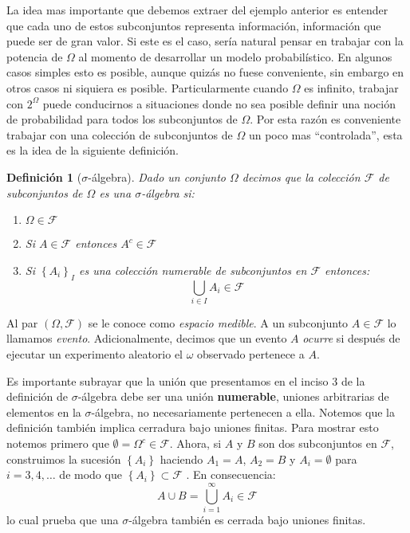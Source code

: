 \documentclass{extreport}
\theoremstyle{definicion}
\newtheorem{definition}{Definición}[chapter]
\theoremstyle{propiedad}
\theoremstyle{teorema}
\begin{document}
La idea mas importante que debemos extraer del ejemplo anterior es entender que cada uno de estos subconjuntos representa información, información que puede ser de gran valor. Si este es el caso, sería natural pensar en trabajar con la potencia de $\Omega$ al momento de desarrollar un modelo probabilístico. En algunos casos simples esto es posible, aunque quizás no fuese conveniente, sin embargo en otros casos ni siquiera es posible. Particularmente cuando $\Omega$ es infinito, trabajar con $2^\Omega$ puede conducirnos a situaciones donde no sea posible definir una noción de probabilidad para todos los subconjuntos de $\Omega$. Por esta razón es conveniente trabajar con una colección de subconjuntos de $\Omega$ un poco mas ``controlada'', esta es la idea de la siguiente definición. 
\begin{definition}[$\sigma$-álgebra]
    Dado un conjunto $\Omega$ decimos que la colección $\mathcal{F}$ de subconjuntos de $\Omega$ es una $\sigma$-\emph{álgebra} si:
    \begin{enumerate}
        \item $\Omega \in \mathcal{F}$
        \item Si $A\in \mathcal{F}$ entonces $A^c \in \mathcal{F}$
        \item Si $\left\{A_i\right\}_{I}$ es una colección numerable de subconjuntos en $\mathcal{F}$ entonces:
        $$
            \bigcup_{i\in I} A_i \in \mathcal{F}
        $$
    \end{enumerate}
\end{definition}
\par\noindent
Al par $(\Omega, \mathcal{F})$  se le conoce como \emph{espacio medible}. A un subconjunto $A\in \mathcal{F}$ lo llamamos \emph{evento}. Adicionalmente, decimos que un evento $A$ \emph{ocurre} si después de ejecutar un experimento aleatorio el $\omega$ observado pertenece a $A$.

Es importante subrayar que la unión que presentamos en el inciso 3 de la definición de $\sigma$-álgebra debe ser una unión \textbf{numerable}, uniones arbitrarias de elementos en la $\sigma$-álgebra, no necesariamente pertenecen a ella. Notemos que la definición también implica cerradura bajo uniones finitas. Para mostrar esto notemos primero que $\emptyset = \Omega^c \in \mathcal{F}$.  Ahora, si $A$ y $B$ son dos subconjuntos en $\mathcal{F}$, construimos la sucesión $\left\{A_i\right\}$ haciendo $A_1 = A$, $A_2 = B$ y $A_i = \emptyset$ para $i= 3,4,\ldots$ de modo  que  $\left\{A_i\right\}\subset \mathcal{F}$ . En consecuencia:
$$
A \cup B = \bigcup_{i = 1}^\infty A_i \in \mathcal{F}
$$
lo cual prueba que una $\sigma$-álgebra también es cerrada bajo uniones finitas. 
\end{document}
